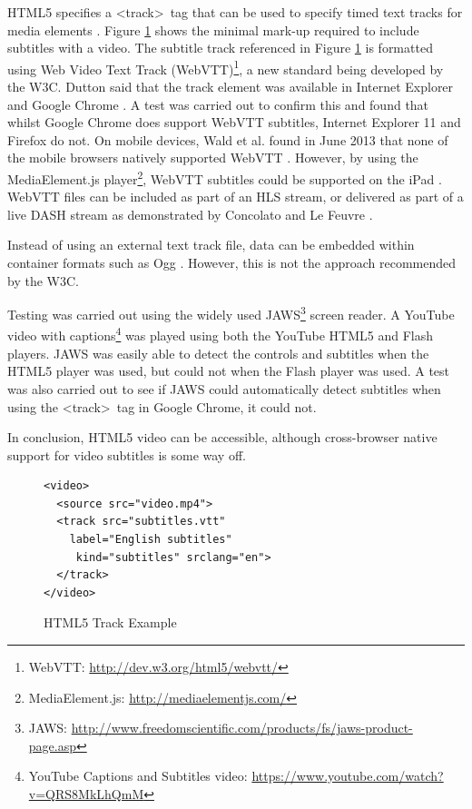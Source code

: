 \documentclass[journal]{IEEEtran}
\begin{document}
HTML5 specifies a \textless track\textgreater~tag that can be used to specify timed text tracks for media elements \cite{standard:html5}. Figure \ref{lst:trackExample} shows the minimal mark-up required to include subtitles with a video. The subtitle track referenced in Figure \ref{lst:trackExample} is formatted using Web Video Text Track (WebVTT)\footnote{WebVTT: \url{http://dev.w3.org/html5/webvtt/}}, a new standard being developed by the W3C. Dutton said that the track element was available in Internet Explorer and Google Chrome \cite{website:html5RocksTrackElement}. A test was carried out to confirm this and found that whilst Google Chrome does support WebVTT subtitles, Internet Explorer 11 and Firefox do not. On mobile devices, Wald et al. found in June 2013 that none of the mobile browsers natively supported WebVTT \cite{article:synote}. However, by using the MediaElement.js player\footnote{MediaElement.js: \url{http://mediaelementjs.com/}}, WebVTT subtitles could be supported on the iPad \cite{article:synote}. WebVTT files can be included as part of an HLS stream, or delivered as part of a live DASH stream as demonstrated by Concolato and Le Feuvre \cite{misc:HTTPLiveStreaming}\cite{inproceedings:liveHTTPSubtitle}.

Instead of using an external text track file, data can be embedded within container formats such as Ogg \cite{inproceedings:accessibilityForTheHTML5VideoElement}\cite{website:oggSubtitles}. However, this is not the approach recommended by the W3C. %

Testing was carried out using the widely used JAWS\footnote{JAWS: \url{http://www.freedomscientific.com/products/fs/jaws-product-page.asp}} screen reader. A YouTube video with captions\footnote{YouTube Captions and Subtitles video: \url{https://www.youtube.com/watch?v=QRS8MkLhQmM}} was played using both the YouTube HTML5 and Flash players. JAWS was easily able to detect the controls and subtitles when the HTML5 player was used, but could not when the Flash player was used. A test was also carried out to see if JAWS could automatically detect subtitles when using the \textless track\textgreater~tag in Google Chrome, it could not.

In conclusion, HTML5 video can be accessible, although cross-browser native support for video subtitles is some way off.

\begin{figure}
\caption{HTML5 Track Example \cite{website:html5RocksTrackElement}}
\begin{lstlisting}[frame=single,language=HTML5]
<video>
  <source src="video.mp4">
  <track src="subtitles.vtt"
    label="English subtitles"
     kind="subtitles" srclang="en">
  </track>
</video>
\end{lstlisting}
\label{lst:trackExample}
\end{figure}
\end{document}

